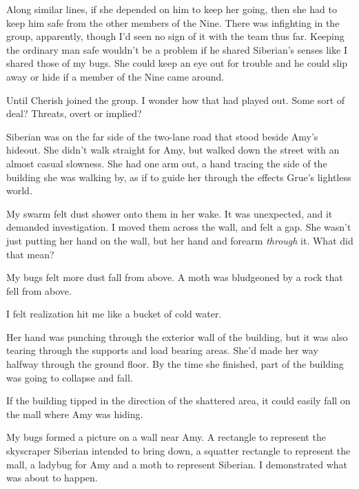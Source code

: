 Along similar lines, if she depended on him to keep her going, then she had to keep him safe from the other members of the Nine.  There was infighting in the group, apparently, though I'd seen no sign of it with the team thus far.  Keeping the ordinary man safe wouldn't be a problem if he shared Siberian's senses like I shared those of my bugs.  She could keep an eye out for trouble and he could slip away or hide if a member of the Nine came around.



Until Cherish joined the group.  I wonder how that had played out.  Some sort of deal?  Threats, overt or implied?



Siberian was on the far side of the two-lane road that stood beside Amy's hideout.  She didn't walk straight for Amy, but walked down the street with an almost casual slowness.  She had one arm out, a hand tracing the side of the building she was walking by, as if to guide her through the effects Grue's lightless world.



My swarm felt dust shower onto them in her wake.  It was unexpected, and it demanded investigation.  I moved them across the wall, and felt a gap.  She wasn't just putting her hand on the wall, but her hand and forearm \emph{through }it.  What did that mean?



My bugs felt more dust fall from above.  A moth was bludgeoned by a rock that fell from above.



I felt realization hit me like a bucket of cold water.



Her hand was punching through the exterior wall of the building, but it was also tearing through the supports and load bearing areas.  She'd made her way halfway through the ground floor.  By the time she finished, part of the building was going to collapse and fall.



If the building tipped in the direction of the shattered area, it could easily fall on the mall where Amy was hiding.



My bugs formed a picture on a wall near Amy.  A rectangle to represent the skyscraper Siberian intended to bring down, a squatter rectangle to represent the mall, a ladybug for Amy and a moth to represent Siberian.  I demonstrated what was about to happen.



